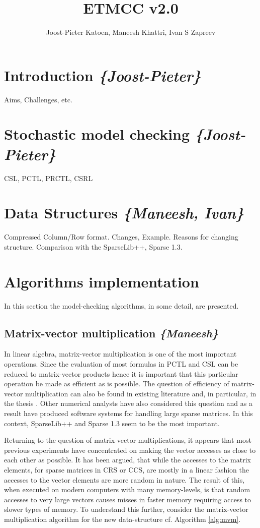 \documentclass[a4paper,10pt]{article}
\title{ETMCC v2.0}
\author{Joost-Pieter Katoen, Maneesh Khattri, Ivan S Zapreev}
\begin{document}
\maketitle

\newpage

\tableofcontents 

\newpage

\section{Introduction \textit{\{Joost-Pieter\}}}
	Aims, Challenges, etc.

\section{Stochastic model checking \textit{\{Joost-Pieter\}}}
	CSL, PCTL, PRCTL, CSRL

\section{Data Structures \textit{\{Maneesh, Ivan\}}}
	Compressed Column/Row format. Changes, Example. Reasons for changing structure.
	Comparison with the SparseLib++, Sparse 1.3.

\section{Algorithms implementation}

In this section the model-checking algorithms, in some detail, are presented.

	\subsection{Matrix-vector multiplication \textit{\{Maneesh\}}}
	In linear algebra, matrix-vector multiplication is one of the most important operations. Since
	the evaluation of most formulas in PCTL and CSL can be reduced to matrix-vector products
	hence it is important that this particular operation be made as efficient as is possible. The
	question of efficiency of matrix-vector multiplication can also be found in existing literature
	and, in particular, in the thesis \cite{ejim1}. Other numerical analysts have also considered this
	question and as a result have produced software systems for handling large sparse matrices. In this
	context, SparseLib++ and Sparse 1.3 seem to be the most important.
	
	Returning to the question of matrix-vector multiplications, it appears that most previous experiments
	have concentrated on making the vector accesses as close to each other as possible. It has been argued, that
	while the accesses to the matrix elements, for sparse matrices in CRS or CCS, are mostly in a linear fashion the
	accesses to the vector elements are more random in nature. The result of this, when executed on modern computers
	with many memory-levels, is that random accesses to very large vectors causes misses in faster memory requiring
	access to slower types of memory. To understand this further, consider the matrix-vector multiplication algorithm
	for the new data-structure cf. Algorithm \ref{alg:mvm}.
	
\end{document}
